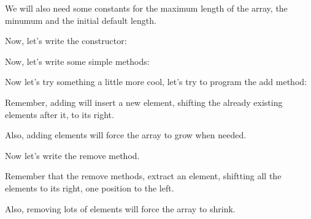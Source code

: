 \documentclass[a4paper, 9pt]{extarticle}
\begin{document}
We will also need some constants for the maximum length of the array, the
minumum and the initial default length.

Now, let's write the constructor:


Now, let's write some simple methods:




Now let's try something a little more cool, let's try to program the add method:

Remember, adding will insert a new element, shifting the already existing elements after it, to its right.

Also, adding elements will force the array to grow when needed.




Now let's write the remove method.

Remember that the remove methods, extract an element, shiftting all the elements to its right, one position to the left.

Also, removing lots of elements will force the array to shrink.


\end{document}
